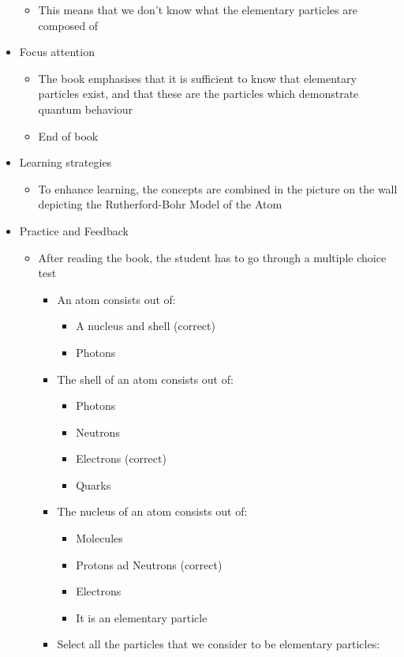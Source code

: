 \documentclass[11pt,twoside]{report} %
\begin{document}
\begin{itemize}
\begin{itemize}
			\item This means that we don’t know what the elementary particles are composed of
		\end{itemize}
		\item Focus attention
		\begin{itemize}
			\item The book emphasises that it is sufficient to know that elementary particles exist, and that these are the particles which demonstrate quantum behaviour
			\item {End of book}
		\end{itemize}
		\item Learning strategies
		\begin{itemize}
			\item To enhance learning, the concepts are combined in the picture on the wall depicting the Rutherford-Bohr Model of the Atom
		\end{itemize}
		\item Practice and Feedback
		\begin{itemize}
			\item After reading the book, the student has to go through a multiple choice test
			\begin{itemize}
				\item An atom consists out of:
				\begin{itemize}
					\item A nucleus and shell (correct)
					\item Photons
				\end{itemize}
				\item The shell of an atom consists out of:
				\begin{itemize}
					\item Photons
					\item Neutrons
					\item Electrons (correct)
					\item Quarks
				\end{itemize}
				\item The nucleus of an atom consists out of:
				\begin{itemize}
					\item Molecules
					\item Protons ad Neutrons (correct)
					\item Electrons
					\item It is an elementary particle
				\end{itemize}
				\item Select all the particles that we consider to be elementary particles:

\end{itemize}
\end{itemize}
\end{itemize}
\end{document}
